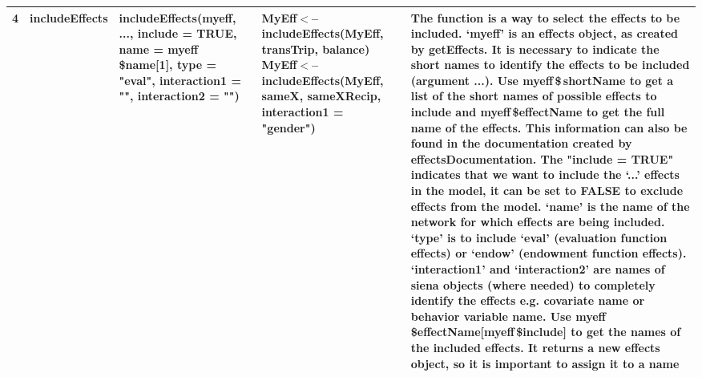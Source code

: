 \documentclass[a4paper,fleqn,11pt]{article}
\newcommand{\+}{\, + \,}
\begin{document}
\begin{landscape}
\begin{small}
\begin{longtable}{c | p{3.8cm} | p{4.5cm} | p{4.0cm} | p{7.4cm} }
4 & includeEffects & includeEffects(myeff, ..., \newline include = TRUE, \newline
name = myeff{\,\$}name[1], type =  "eval", \newline
interaction1 = "",\newline
interaction2 = "") & {MyEff$<$--includeEffects(MyEff, transTrip, balance)
\flushleft MyEff$<$--includeEffects(MyEff, sameX, \newline
sameXRecip, \newline
interaction1 = "gender")}
 &The function is a
way to select the effects to be included. `myeff' is an effects object, as
created by getEffects. It is necessary to indicate the short names to identify
the effects to be included (argument ...).
Use myeff{\,\$\,}shortName to get a list
of the short names of possible effects to include and myeff{\,\$}effectName to get
the full name of the effects. This information can also be found in the
documentation created by effectsDocumentation. The "include = TRUE" indicates
that we want to include the `...' effects in the model, it can be set to
FALSE to exclude effects from the model. `name' is the name of the network
for which effects are being included. `type' is to include `eval'
(evaluation function effects) or `endow' (endowment function effects).
`interaction1' and `interaction2' are names of siena objects (where needed)
to completely identify the effects e.g. covariate name or behavior variable
name. Use myeff{\,\$}effectName[myeff{\,\$}include]
to get the names of the included
effects. It returns a new effects object, so it is important to assign it to a
name\\
\hline


\end{longtable}
\end{small}
\end{landscape}
\end{document}
